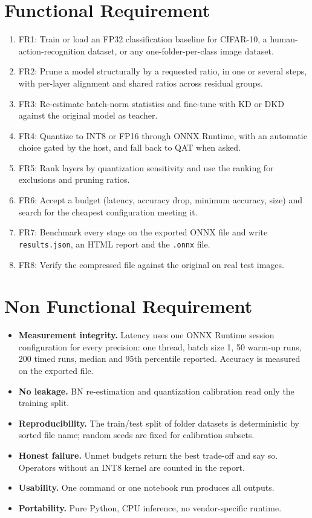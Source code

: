 \documentclass[oneside,a4paper,12pt]{report}
\newcommand{\code}[1]{\texttt{\small #1}}
\begin{document}
\section{Functional Requirement}
\begin{enumerate}
\item FR1: Train or load an FP32 classification baseline for CIFAR-10, a human-action-recognition dataset, or any one-folder-per-class image dataset.
\item FR2: Prune a model structurally by a requested ratio, in one or several steps, with per-layer alignment and shared ratios across residual groups.
\item FR3: Re-estimate batch-norm statistics and fine-tune with KD or DKD against the original model as teacher.
\item FR4: Quantize to INT8 or FP16 through ONNX Runtime, with an automatic choice gated by the host, and fall back to QAT when asked.
\item FR5: Rank layers by quantization sensitivity and use the ranking for exclusions and pruning ratios.
\item FR6: Accept a budget (latency, accuracy drop, minimum accuracy, size) and search for the cheapest configuration meeting it.
\item FR7: Benchmark every stage on the exported ONNX file and write \code{results.json}, an HTML report and the \code{.onnx} file.
\item FR8: Verify the compressed file against the original on real test images.
\end{enumerate}

\section{Non Functional Requirement }
\begin{itemize}
\item \textbf{Measurement integrity.} Latency uses one ONNX Runtime session configuration for every precision: one thread, batch size 1, 50 warm-up runs, 200 timed runs, median and 95th percentile reported. Accuracy is measured on the exported file.
\item \textbf{No leakage.} BN re-estimation and quantization calibration read only the training split.
\item \textbf{Reproducibility.} The train/test split of folder datasets is deterministic by sorted file name; random seeds are fixed for calibration subsets.
\item \textbf{Honest failure.} Unmet budgets return the best trade-off and say so. Operators without an INT8 kernel are counted in the report.
\item \textbf{Usability.} One command or one notebook run produces all outputs.
\item \textbf{Portability.} Pure Python, CPU inference, no vendor-specific runtime.
\end{itemize}
\end{document}
